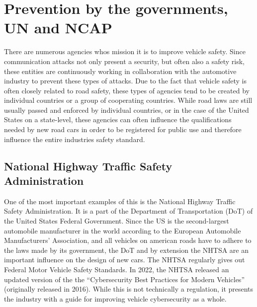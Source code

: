 \section{Prevention by the governments, UN and NCAP}
There are numerous agencies whos mission it is to improve vehicle safety. Since communication attacks not only present a security, but often also a safety risk, these entities are continuously working in collaboration with the automotive industry to prevent these types of attacks. Due to the fact that vehicle safety is often closely related to road safety, these types of agencies tend to be created by individual countries or a group of cooperating countries. While road laws are still usually passed and enforced by individual countries, or in the case of the United States on a state-level, these agencies can often influence the qualifications needed by new road cars in order to be registered for public use and therefore influence the entire industries safety standard.

\subsection{National Highway Traffic Safety Administration}
One of the most important examples of this is the National Highway Traffic Safety Administration. It is a part of the Department of Transportation (DoT) of the United States Federal Government. Since the US is the second-largest automobile manufacturer in the world according to the European Automobile Manufacturers' Association,\cite{acea} and all vehicles on american roads have to adhere to the laws made by its government, the DoT and by extension the NHTSA are an important influence on the design of new cars. The NHTSA regularly gives out Federal Motor Vehicle Safety Standards.\cite{nhtsacybersec} %
In 2022, the NHTSA released an updated version of the  the ``Cybersecurity Best Practices for
Modern Vehicles'' (originally released in 2016). While this is not technically a regulation, it presents the industry with a guide for improving vehicle cybersecurity as a whole.\cite{nhtsabestpractice}


